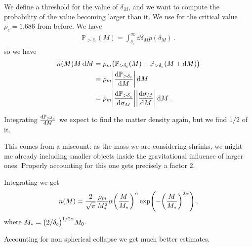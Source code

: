 \documentclass[main.tex]{subfiles}
\begin{document}
We define a threshold for the value of \(\delta_{M}\), and we want to compute the probability of the value becoming larger than it. 
We use for the critical value \(\rho_{c} = 1.686   \) from before. 
We have 
%
\begin{align}
\mathbb{P}_{> \delta_{c}}(M) = \int_{ \delta_{c}}^{ \infty } \dd{ \delta_{M}} p( \delta_{M})
\,.
\end{align}
%
so we have 
%
\begin{subequations}
\begin{align}
n(M) M \dd{M} 
&= \rho_{m} \qty(\mathbb{P}_{ > \delta_{c}} (M) - \mathbb{P}_{ > \delta_{c}} (M + \dd{M})) \\
&= \rho_{m} \abs{ \dv{\mathbb{P}_{> \delta_{c}}}{M}} \dd{M}  \\
&= \rho_{m} \abs{ \dv{\mathbb{P}_{> \delta_{c}}}{ \sigma_{M}}} \abs{ \dv{\sigma_{M}}{M}} \dd{M}
\,.
\end{align}
\end{subequations}

Integrating \( \dv{\mathbb{P}_{> \delta_{c}}}{M}\) we expect to find the matter density again, but we find \(1/2\) of it. 

This comes from a miscount: as the mass we are considering shrinks, we might me already including smaller objects inside the gravitational influence of larger ones. Properly accounting for this one gets precisely a factor 2. 

Integrating we get 
%
\begin{align}
n(M) = \frac{2}{\sqrt{\pi }} \frac{\rho_{m}}{M_{*}^2}
\alpha \qty(\frac{M}{M_{*}})^{\alpha }
\exp(- \qty(\frac{M}{M_{*}})^{2 \alpha })
\,,
\end{align}
%
where \(M_{*} = \qty(2 / \delta_{c})^{ 1/ 2 \alpha } M_0 \). 

Accounting for non spherical collapse we get much better estimates.
\end{document}
